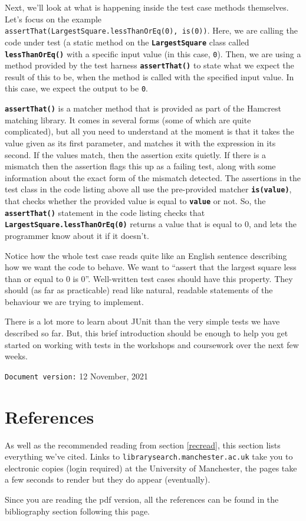 \documentclass[
]{book}
\begin{document}
Next, we'll look at what is happening inside the test case methods themselves. Let's focus on the example \texttt{assertThat(LargestSquare.lessThanOrEq(0),\ is(0))}. Here, we are calling the code under test (a static method on the \textbf{\texttt{LargestSquare}} class called \textbf{\texttt{lessThanOrEq()}} with a specific input value (in this case, \texttt{0}). Then, we are using a method provided by the test harness \textbf{\texttt{assertThat()}} to state what we expect the result of this to be, when the method is called with the specified input value. In this case, we expect the output to be \texttt{0}.

\textbf{\texttt{assertThat()}} is a matcher method that is provided as part of the Hamcrest matching library. It comes in several forms (some of which are quite complicated), but all you need to understand at the moment is that it takes the value given as its first parameter, and matches it with the expression in its second. If the values match, then the assertion exits quietly. If there is a mismatch then the assertion flags this up as a failing test, along with some information about the exact form of the mismatch detected. The assertions in the test class in the code listing above all use the pre-provided matcher \textbf{\texttt{is(value)}}, that checks whether the provided value is equal to \textbf{\texttt{value}} or not. So, the \textbf{\texttt{assertThat()}} statement in the code listing checks that \textbf{\texttt{LargestSquare.lessThanOrEq(0)}} returns a value that is equal to 0, and lets the programmer know about it if it doesn't.

Notice how the whole test case reads quite like an English sentence describing how we want the code to behave. We want to ``assert that the largest square less than or equal to 0 is 0''. Well-written test cases should have this property. They should (as far as practicable) read like natural, readable statements of the behaviour we are trying to implement.

There is a lot more to learn about JUnit than the very simple tests we have described so far. But, this brief introduction should be enough to help you get started on working with tests in the workshops and coursework over the next few weeks.

\texttt{Document\ version:} 12 November, 2021

\hypertarget{reading}{%
\chapter{References}\label{reading}}

As well as the recommended reading from section \ref{recread}, this section lists everything we've cited. Links to \texttt{librarysearch.manchester.ac.uk} take you to electronic copies (login required) at the University of Manchester, the pages take a few seconds to render but they do appear (eventually).

Since you are reading the pdf version, all the references can be found in the bibliography section following this page.

  
\end{document}
